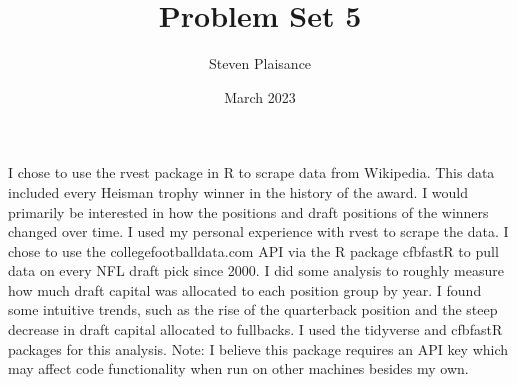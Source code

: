 \documentclass{article}
\title{Problem Set 5}
\author{Steven Plaisance}
\date{March 2023}
\begin{document}
\maketitle

I chose to use the rvest package in R to scrape data from Wikipedia. This data included every Heisman trophy winner in the history of the award. I would primarily be interested in how the positions and draft positions of the winners changed over time. I used my personal experience with rvest to scrape the data. 
\linebreak
\linebreak
I chose to use the collegefootballdata.com API via the R package cfbfastR to pull data on every NFL draft pick since 2000. I did some analysis to roughly measure how much draft capital was allocated to each position group by year. I found some intuitive trends, such as the rise of the quarterback position and the steep decrease in draft capital allocated to fullbacks. I used the tidyverse and cfbfastR packages for this analysis. Note: I believe this package requires an API key which may affect code functionality when run on other machines besides my own. 
\end{document}
